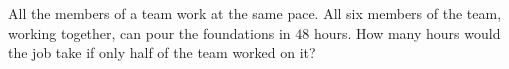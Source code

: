 All the members of a team work at the same pace. All six members of the team, working together, can pour the foundations in $48$ hours. How many hours would the job take if only half of the team worked on it?
